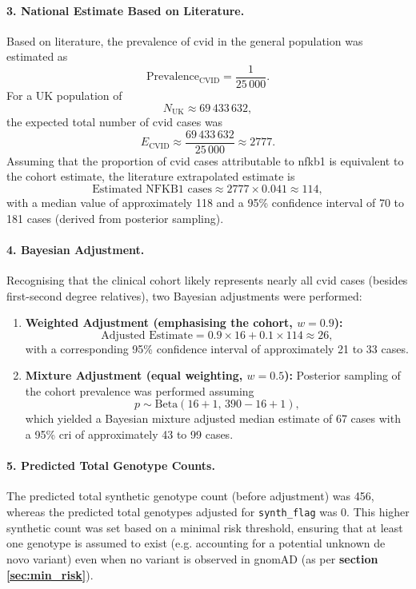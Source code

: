 \paragraph{3. National Estimate Based on Literature.}
Based on literature, the prevalence of \ac{cvid} in the general population was estimated as
\[
\text{Prevalence}_{\text{CVID}} = \frac{1}{25\,000}.
\]
For a UK population of 
\[
N_{\text{UK}} \approx 69\,433\,632,
\]
the expected total number of \ac{cvid} cases was
\[
E_{\text{CVID}} \approx \frac{69\,433\,632}{25\,000} \approx 2777.
\]
Assuming that the proportion of \ac{cvid} cases attributable to \ac{nfkb1} is equivalent to the cohort estimate, the literature extrapolated estimate is
\[
\text{Estimated NFKB1 cases} \approx 2777 \times 0.041 \approx 114,
\]
with a median value of approximately 118 and a 95\% confidence interval of 70 to 181 cases (derived from posterior sampling).

\paragraph{4. Bayesian Adjustment.}
Recognising that the clinical cohort likely represents nearly all \ac{cvid} cases (besides first-second degree relatives), two Bayesian adjustments were performed:
\begin{enumerate}
  \item \textbf{Weighted Adjustment (emphasising the cohort, \(w=0.9\)):}
  \[
  \text{Adjusted Estimate} = 0.9 \times 16 + 0.1 \times 114 \approx 26,
  \]
  with a corresponding 95\% confidence interval of approximately 21 to 33 cases.
  
  \item \textbf{Mixture Adjustment (equal weighting, \(w=0.5\)):}  
  Posterior sampling of the cohort prevalence was performed assuming
  \[
  p \sim \mathrm{Beta}(16+1,\,390-16+1),
  \]
  which yielded a Bayesian mixture adjusted median estimate of 67 cases with a 95\% \ac{cri} of approximately 43 to 99 cases.
\end{enumerate}

\paragraph{5. Predicted Total Genotype Counts.}
The predicted total synthetic genotype count (before adjustment) was 456, whereas the predicted total genotypes adjusted for \texttt{synth\_flag} was 0. This higher synthetic count was set based on a minimal risk threshold, ensuring that at least one genotype is assumed to exist (e.g. accounting for a potential unknown de novo variant) even when no variant is observed in gnomAD (as per \textbf{section
\ref{sec:min_risk}}).


